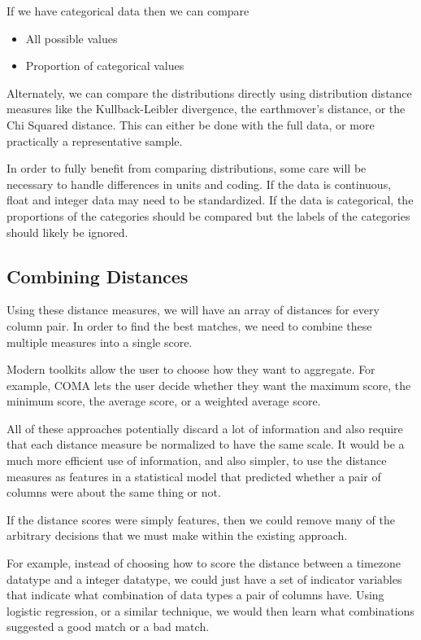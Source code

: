 \documentclass{datamade}
\theoremstyle{definition}
\theoremstyle{remark}
\begin{document}
If we have categorical data then we can compare

\begin{itemize}
\item All possible values
\item Proportion of categorical values 
\end{itemize}

Alternately, we can compare the distributions directly using
distribution distance measures like the Kullback-Leibler divergence,
the earthmover's distance, or the Chi Squared distance. This can
either be done with the full data, or more practically a representative
sample.

In order to fully benefit from comparing distributions, some care will
be necessary to handle differences in units and coding. If the data is
continuous, float and integer data may need to be standardized. If the
data is categorical, the proportions of the categories should be
compared but the labels of the categories should likely be ignored.

\subsection*{Combining Distances}
Using these distance measures, we will have an array of distances for
every column pair. In order to find the best matches, we need to
combine these multiple measures into a single score.

Modern toolkits allow the user to choose how they want to
aggregate. For example, COMA lets the user decide whether they want
the maximum score, the minimum score, the average score, or a weighted
average score.

All of these approaches potentially discard a lot of information and
also require that each distance measure be normalized to have the same
scale. It would be a much more efficient use of information, and also
simpler, to use the distance measures as features in a statistical
model that predicted whether a pair of columns were about the same
thing or not.

If the distance scores were simply features, then we could remove many
of the arbitrary decisions that we must make within the existing
approach.

For example, instead of choosing how to score the distance between a
timezone datatype and a integer datatype, we could just have a set of
indicator variables that indicate what combination of data types a
pair of columns have. Using logistic regression, or a similar
technique, we would then learn what combinations suggested a good
match or a bad match.
\end{document}
